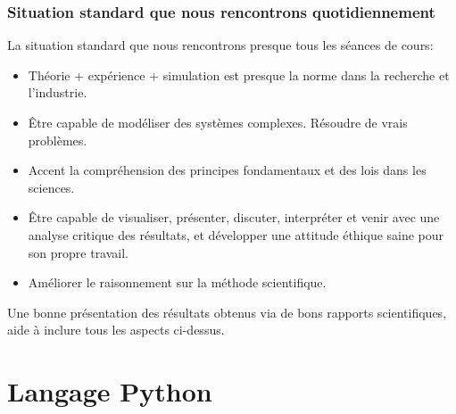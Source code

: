 \documentclass{beamer}
\begin{document}
\begin{frame}
\frametitle{Situation standard que nous rencontrons quotidiennement}


La situation standard que nous rencontrons presque tous les séances de cours:

\begin{itemize}
\item Théorie + expérience + simulation est presque la norme dans la recherche et l'industrie.

\item Être capable de modéliser des systèmes complexes. Résoudre de vrais problèmes.

\item Accent la compréhension des principes fondamentaux et des lois dans les sciences.

\item Être capable de visualiser, présenter, discuter, interpréter et venir avec une analyse critique des résultats, et développer une attitude éthique saine pour son propre travail.

\item Améliorer le raisonnement sur la méthode scientifique.
\end{itemize}

\noindent
Une bonne présentation des résultats obtenus via de bons rapports scientifiques, aide à inclure tous les aspects ci-dessus.


\end{frame}

\section{Langage Python}
\end{document}
